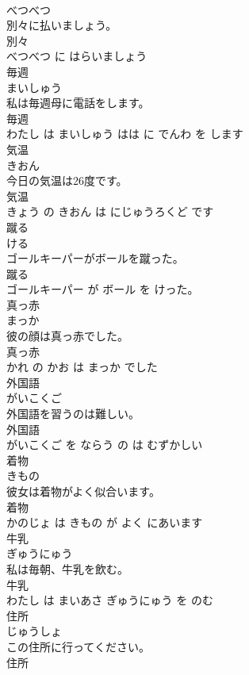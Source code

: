 \documentclass[8pt]{extreport}
\begin{document}
\begin{CJK}{UTF8}{min}
\\	べつべつ			
\\	別々に払いましょう。	
\\	別々 
\\	べつべつ に はらいましょう			
\\	毎週	
\\	まいしゅう			
\\	私は毎週母に電話をします。	
\\	毎週 
\\	わたし は まいしゅう はは に でんわ を します			
\\	気温	
\\	きおん			
\\	今日の気温は26度です。	
\\	気温 
\\	きょう の きおん は にじゅうろくど です			
\\	蹴る	
\\	ける			
\\	ゴールキーパーがボールを蹴った。	
\\	蹴る 
\\	ゴールキーパー が ボール を けった。			
\\	真っ赤	
\\	まっか			
\\	彼の顔は真っ赤でした。	
\\	真っ赤 
\\	かれ の かお は まっか でした			
\\	外国語	
\\	がいこくご			
\\	外国語を習うのは難しい。	
\\	外国語 
\\	がいこくご を ならう の は むずかしい			
\\	着物	
\\	きもの			
\\	彼女は着物がよく似合います。	
\\	着物 
\\	かのじょ は きもの が よく にあいます			
\\	牛乳	
\\	ぎゅうにゅう			
\\	私は毎朝、牛乳を飲む。	
\\	牛乳 
\\	わたし は まいあさ ぎゅうにゅう を のむ			
\\	住所	
\\	じゅうしょ			
\\	この住所に行ってください。	
\\	住所 

\end{CJK}
\end{document}
